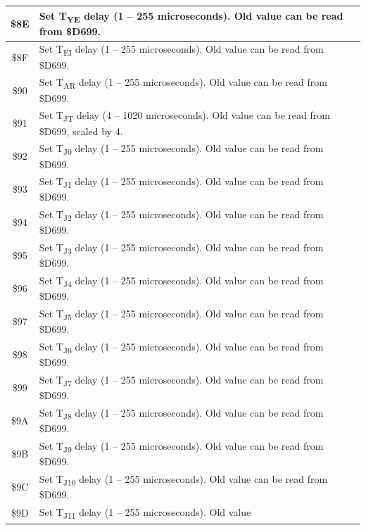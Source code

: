 \begin{center}
\begin{longtable}{|c|L{8cm}|}
        \$8E & Set T\textsubscript{YE} delay (1 -- 255 microseconds). Old value
        can be read from \$D699. \\ \hline        
        \$8F & Set T\textsubscript{EI} delay (1 -- 255 microseconds). Old value
        can be read from \$D699. \\ \hline        
        \$90 & Set T\textsubscript{AR} delay (1 -- 255 microseconds). Old value
        can be read from \$D699. \\ \hline        
        \$91 & Set T\textsubscript{JT} delay (4 -- 1020 microseconds). Old value
        can be read from \$D699, scaled by 4. \\ \hline        
        \$92 & Set T\textsubscript{J0} delay (1 -- 255 microseconds). Old value
        can be read from \$D699. \\ \hline        
        \$93 & Set T\textsubscript{J1} delay (1 -- 255 microseconds). Old value
        can be read from \$D699. \\ \hline        
        \$94 & Set T\textsubscript{J2} delay (1 -- 255 microseconds). Old value
        can be read from \$D699. \\ \hline        
        \$95 & Set T\textsubscript{J3} delay (1 -- 255 microseconds). Old value
        can be read from \$D699. \\ \hline        
        \$96 & Set T\textsubscript{J4} delay (1 -- 255 microseconds). Old value
        can be read from \$D699. \\ \hline        
        \$97 & Set T\textsubscript{J5} delay (1 -- 255 microseconds). Old value
        can be read from \$D699. \\ \hline        
        \$98 & Set T\textsubscript{J6} delay (1 -- 255 microseconds). Old value
        can be read from \$D699. \\ \hline        
        \$99 & Set T\textsubscript{J7} delay (1 -- 255 microseconds). Old value
        can be read from \$D699. \\ \hline        
        \$9A & Set T\textsubscript{J8} delay (1 -- 255 microseconds). Old value
        can be read from \$D699. \\ \hline        
        \$9B & Set T\textsubscript{J9} delay (1 -- 255 microseconds). Old value
        can be read from \$D699. \\ \hline        
        \$9C & Set T\textsubscript{J10} delay (1 -- 255 microseconds). Old value
        can be read from \$D699. \\ \hline        
        \$9D & Set T\textsubscript{J11} delay (1 -- 255 microseconds). Old value

\end{longtable}
\end{center}
